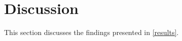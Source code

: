 \section{Discussion}
\label{discussion}
This section discusses the findings presented in \ref{results}.

